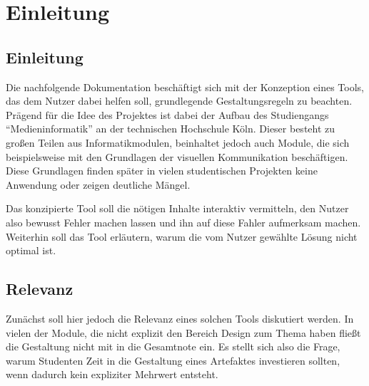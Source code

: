 

\newcommand{\chaptertitle}{Einleitung}

\chapter{\chaptertitle} %

\label{Einleitung} %

\lhead{\chaptername{} \thechapter{} - \emph{\chaptertitle}} %


\section{Einleitung}
Die nachfolgende Dokumentation beschäftigt sich mit der Konzeption eines Tools, das dem Nutzer dabei helfen soll, grundlegende Gestaltungsregeln zu beachten.
Prägend für die Idee des Projektes ist dabei der Aufbau des Studiengangs “Medieninformatik” an der technischen Hochschule Köln. Dieser besteht zu großen Teilen aus Informatikmodulen, beinhaltet jedoch auch Module, die sich beispielsweise mit den Grundlagen der visuellen Kommunikation beschäftigen. Diese Grundlagen finden später in vielen studentischen Projekten keine Anwendung oder zeigen deutliche Mängel.

Das konzipierte Tool soll die nötigen Inhalte interaktiv vermitteln, den Nutzer also bewusst Fehler machen lassen und ihn auf diese Fahler aufmerksam machen. Weiterhin soll das Tool erläutern, warum die vom Nutzer gewählte Lösung nicht optimal ist.



\section{Relevanz}
Zunächst soll hier jedoch die Relevanz eines solchen Tools diskutiert werden. In vielen der Module, die nicht explizit den Bereich Design zum Thema haben fließt die Gestaltung nicht mit in die Gesamtnote ein. Es stellt sich also die Frage, warum Studenten Zeit in die Gestaltung eines Artefaktes investieren sollten, wenn dadurch kein expliziter Mehrwert entsteht.

